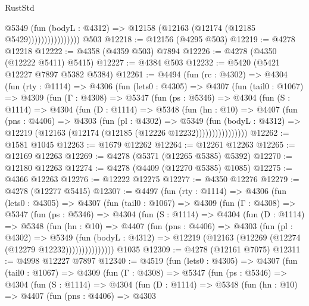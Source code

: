\begin{lexlean}{RustStd}
\begin{coremodule}
                          @5349
                            (fun (bodyL : @4312) =>
                            @12158 (@12163 (@12174 (@12185 @5429))))))))))))))))
    @503
@12218 := @12156 (@4295 @503)
@12219 := @4278 @12218
@12222 := @4358 (@4359 @503) @7894
@12226 := @4278 (@4350 (@12222 @5411) @5415)
@12227 := @4384 @503
@12232 := @5420 (@5421 @12227 @7897 @5382 @5384)
@12261 := @4494
    (fun (rc : @4302) =>
    @4304
      (fun (rty : @1114) =>
      @4306
        (fun (lets0 : @4305) =>
        @4307
          (fun (tail0 : @1067) =>
          @4309
            (fun (Γ : @4308) =>
            @5347
              (fun (ps : @5346) =>
              @4304
                (fun (S : @1114) =>
                @4304
                  (fun (D : @1114) =>
                  @5348
                    (fun (hn : @10) =>
                    @4407
                      (fun (pns : @4406) =>
                      @4303
                        (fun (pl : @4302) =>
                        @5349
                          (fun (bodyL : @4312) =>
                          @12219 (@12163 (@12174 (@12185 (@12226 @12232))))))))))))))))
@12262 := @1581 @1045
@12263 := @1679 @12262
@12264 := @12261 @12263
@12265 := @12169 @12263
@12269 := @4278 (@5371 (@12265 @5385) @5392)
@12270 := @12180 @12263
@12274 := @4278 (@4409 (@12270 @5385) @1085)
@12275 := @4366 @12263
@12276 := @12222 @12275
@12277 := @4350 @12276
@12279 := @4278 (@12277 @5415)
@12307 := @4497
    (fun (rty : @1114) =>
    @4306
      (fun (lets0 : @4305) =>
      @4307
        (fun (tail0 : @1067) =>
        @4309
          (fun (Γ : @4308) =>
          @5347
            (fun (ps : @5346) =>
            @4304
              (fun (S : @1114) =>
              @4304
                (fun (D : @1114) =>
                @5348
                  (fun (hn : @10) =>
                  @4407
                    (fun (pns : @4406) =>
                    @4303
                      (fun (pl : @4302) =>
                      @5349
                        (fun (bodyL : @4312) =>
                        @12219 (@12163 (@12269 (@12274 (@12279 @12232)))))))))))))))
    @1035
@12309 := @4278 (@12161 @7075)
@12311 := @4998 @12227 @7897
@12340 := @4519
    (fun (lets0 : @4305) =>
    @4307
      (fun (tail0 : @1067) =>
      @4309
        (fun (Γ : @4308) =>
        @5347
          (fun (ps : @5346) =>
          @4304
            (fun (S : @1114) =>
            @4304
              (fun (D : @1114) =>
              @5348
                (fun (hn : @10) =>
                @4407
                  (fun (pns : @4406) =>
                  @4303

\end{coremodule}
\end{lexlean}
